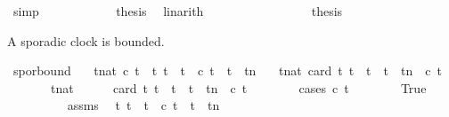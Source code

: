 \begin{isabellebody}
\ simp\isanewline
\ \ \ \ \ \ \ \ \ \ \isamarkupfalse%
\ {\isacharquery}thesis\ \isamarkupfalse%
\ linarith\isanewline
\ \ \ \ \ \ \isamarkupfalse%
\isanewline
\ \ \ \ \isamarkupfalse%
\isanewline
\ \ \isacommand{{\isacharbraceright}}\isamarkupfalse%
\ \isamarkupfalse%
\ {\isacharquery}thesis\ \isacommand{{\isachardot}{\isachardot}}\isamarkupfalse%
\isanewline
{}\isamarkupfalse%
%
\endisatagproof
{\isafoldproof}%
%
\isadelimproof
%
\endisadelimproof
%
\begin{isamarkuptext}%
A sporadic clock is bounded.%
\end{isamarkuptext}\isamarkuptrue%
\isamarkupfalse%
\ spor{\isacharunderscore}bound{\isacharprime}{\isacharcolon}\isanewline
\ \ \ {\isacartoucheopen}{\isasymforall}t{\isacharcolon}{\isacharcolon}nat{\isachardot}\ c\ t\ {\isasymlongrightarrow}\ {\isacharparenleft}{\isasymforall}t{\isacharprime}{\isachardot}\ {\isacharparenleft}t\ {\isacharless}\ t{\isacharprime}\ {\isasymand}\ c\ t{\isacharprime}{\isacharparenright}\ {\isasymlongrightarrow}\ t{\isacharprime}\ {\isachargreater}\ t{\isacharplus}n{\isacharparenright}{\isacartoucheclose}\isanewline
\ \ \ {\isacartoucheopen}{\isasymforall}t{\isacharcolon}{\isacharcolon}nat{\isachardot}\ card\ {\isacharbraceleft}t{\isacharprime}{\isachardot}\ t\ {\isasymle}\ t{\isacharprime}\ {\isasymand}\ t{\isacharprime}\ {\isasymle}\ t{\isacharplus}n\ {\isasymand}\ c\ t{\isacharprime}{\isacharbraceright}\ {\isasymle}\ {}{\isacartoucheclose}\isanewline
%
\isadelimproof
%
\endisadelimproof
%
\isatagproof
{}\isamarkupfalse%
\ {\isacharminus}\isanewline
\ \ \isacommand{{\isacharbraceleft}}\isamarkupfalse%
\ \isamarkupfalse%
\ t{\isacharcolon}{\isacharcolon}nat\isanewline
\ \ \ \ \isamarkupfalse%
\ {\isacartoucheopen}card\ {\isacharbraceleft}t{\isacharprime}{\isachardot}\ t\ {\isasymle}\ t{\isacharprime}\ {\isasymand}\ t{\isacharprime}\ {\isasymle}\ t{\isacharplus}n\ {\isasymand}\ c\ t{\isacharprime}{\isacharbraceright}\ {\isasymle}\ {}{\isacartoucheclose}\isanewline
\ \ \ \ \isamarkupfalse%
\ {\isacharparenleft}cases\ {\isacartoucheopen}c\ t{\isacartoucheclose}{\isacharparenright}\isanewline
\ \ \ \ \ \ \isamarkupfalse%
\ True\isanewline
\ \ \ \ \ \ \ \ \isamarkupfalse%
\ assms\ \isamarkupfalse%
\ {\isacartoucheopen}{\isasymforall}t{\isacharprime}{\isachardot}\ {\isacharparenleft}t\ {\isacharless}\ t{\isacharprime}\ {\isasymand}\ c\ t{\isacharprime}{\isacharparenright}\ {\isasymlongrightarrow}\ t{\isacharprime}\ {\isachargreater}\ t{\isacharplus}n{\isacartoucheclose}\ \isamarkupfalse%

\end{isabellebody}
